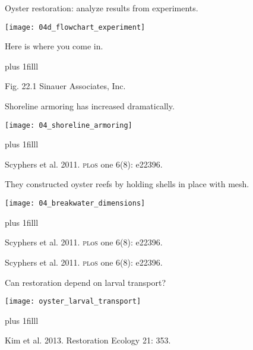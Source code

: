\documentclass[t]{beamer}
\begin{document}
%
\begin{frame}[t]{Oyster restoration: analyze results from experiments.}

	\texttt{[image: 04d\_flowchart\_experiment]}
	
	\hspace{2.5cm}Here is where you come in.
	
	\vskip0pt plus 1filll

\hfill\tiny Fig. 22.1 \textcopyright Sinauer Associates, Inc. 
\end{frame}
%
\begin{frame}[t]{Shoreline armoring has increased dramatically.}

	\centering
		\texttt{[image: 04\_shoreline\_armoring]}
	
	
	\vskip0pt plus 1filll

\hfill\tiny Scyphers et al. 2011. \textsc{pl}o\textsc{s} one 6(8): e22396.
\end{frame}
%
%
\begin{frame}[t]{They constructed oyster reefs by holding shells in place with mesh.}

	\centering
		\texttt{[image: 04\_breakwater\_dimensions]}
	
	
	\vskip0pt plus 1filll

\hfill\tiny Scyphers et al. 2011. \textsc{pl}o\textsc{s} one 6(8): e22396.
\end{frame}
%
{
\begin{frame}[b]

\hfill\tiny Scyphers et al. 2011. \textsc{pl}o\textsc{s} one 6(8): e22396.
\end{frame}
}

%
{
\begin{frame}
\end{frame}
}

%
\begin{frame}[t]{Can restoration depend on larval transport?}

	\centering
		\texttt{[image: oyster\_larval\_transport]}
	
	
	\vskip0pt plus 1filll

\hfill\tiny Kim et al. 2013. Restoration Ecology 21: 353.
\end{frame}
%
\end{document}
